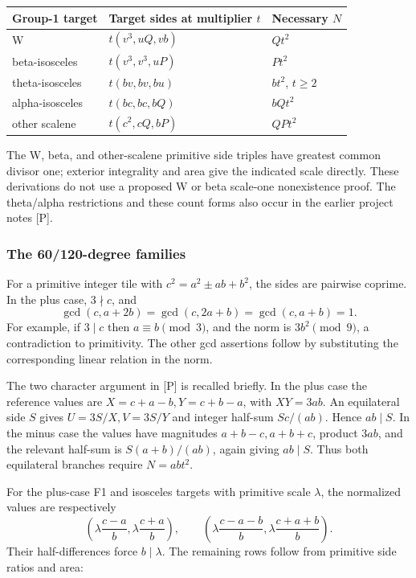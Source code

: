 \documentclass[
  11pt,
]{article}
\begin{document}
\begin{longtable}[]{@{}lll@{}}
\toprule\noalign{}
Group-1 target & Target sides at multiplier \(t\) & Necessary \(N\) \\
\midrule\noalign{}
\endhead
\bottomrule\noalign{}
\endlastfoot
W & \(t(v^3,uQ,vb)\) & \(Qt^2\) \\
beta-isosceles & \(t(v^3,v^3,uP)\) & \(Pt^2\) \\
theta-isosceles & \(t(bv,bv,bu)\) & \(bt^2\), \(t\ge2\) \\
alpha-isosceles & \(t(bc,bc,bQ)\) & \(bQt^2\) \\
other scalene & \(t(c^2,cQ,bP)\) & \(QPt^2\) \\
\end{longtable}

The W, beta, and other-scalene primitive side triples have greatest
common divisor one; exterior integrality and area give the indicated
scale directly. These derivations do not use a proposed W or beta
scale-one nonexistence proof. The theta/alpha restrictions and these
count forms also occur in the earlier project notes {[}P{]}.

\subsubsection{The 60/120-degree
families}\label{the-60120-degree-families}

For a primitive integer tile with \(c^2=a^2\pm ab+b^2\), the sides are
pairwise coprime. In the plus case, \(3\nmid c\), and
\[\gcd(c,a+2b)=\gcd(c,2a+b)=\gcd(c,a+b)=1.\] For example, if \(3\mid c\)
then \(a\equiv b\pmod3\), and the norm is \(3b^2\pmod9\), a
contradiction to primitivity. The other gcd assertions follow by
substituting the corresponding linear relation in the norm.

The two character argument in {[}P{]} is recalled briefly. In the plus
case the reference values are \(X=c+a-b,Y=c+b-a\), with \(XY=3ab\). An
equilateral side \(S\) gives \(U=3S/X,V=3S/Y\) and integer half-sum
\(Sc/(ab)\). Hence \(ab\mid S\). In the minus case the values have
magnitudes \(a+b-c,a+b+c\), product \(3ab\), and the relevant half-sum
is \(S(a+b)/(ab)\), again giving \(ab\mid S\). Thus both equilateral
branches require \(N=abt^2\).

For the plus-case F1 and isosceles targets with primitive scale
\(\lambda\), the normalized values are respectively
\[\left(\lambda\frac{c-a}{b},\lambda\frac{c+a}{b}\right),\qquad
\left(\lambda\frac{c-a-b}{b},\lambda\frac{c+a+b}{b}\right).\] Their
half-differences force \(b\mid\lambda\). The remaining rows follow from
primitive side ratios and area:
\end{document}

